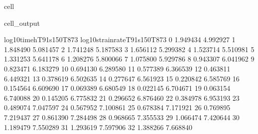 \documentclass[letterpaper,10pt,english]{jupyterBook}
\begin{document}
\begin{sphinxuseclass}{cell}
\begin{sphinxVerbatimOutput}
\begin{sphinxuseclass}{cell_output}
\begin{sphinxVerbatim}[commandchars=\\\{\}]
					log10timeh\PYGZus{}T91s150T873  log10strainrate\PYGZus{}T91s150T873  \PYGZbs{}
					0                \PYGZhy{}1.949434                    \PYGZhy{}4.992927   
					1                \PYGZhy{}1.848490                    \PYGZhy{}5.081457   
					2                \PYGZhy{}1.741248                    \PYGZhy{}5.187583   
					3                \PYGZhy{}1.656112                    \PYGZhy{}5.299382   
					4                \PYGZhy{}1.523714                    \PYGZhy{}5.510981   
					5                \PYGZhy{}1.331253                    \PYGZhy{}5.641178   
					6                \PYGZhy{}1.208276                    \PYGZhy{}5.800066   
					7                \PYGZhy{}1.075800                    \PYGZhy{}5.929786   
					8                \PYGZhy{}0.943307                    \PYGZhy{}6.041962   
					9                \PYGZhy{}0.823471                    \PYGZhy{}6.183279   
					10               \PYGZhy{}0.694130                    \PYGZhy{}6.289580   
					11               \PYGZhy{}0.577389                    \PYGZhy{}6.366539   
					12               \PYGZhy{}0.463811                    \PYGZhy{}6.449321   
					13               \PYGZhy{}0.378619                    \PYGZhy{}6.502635   
					14               \PYGZhy{}0.277647                    \PYGZhy{}6.561923   
					15               \PYGZhy{}0.220842                    \PYGZhy{}6.585769   
					16               \PYGZhy{}0.154564                    \PYGZhy{}6.609690   
					17               \PYGZhy{}0.069389                    \PYGZhy{}6.680549   
					18                0.022145                    \PYGZhy{}6.704671   
					19                0.063154                    \PYGZhy{}6.740088   
					20                0.145205                    \PYGZhy{}6.775832   
					21                0.296652                    \PYGZhy{}6.876460   
					22                0.384978                    \PYGZhy{}6.953193   
					23                0.489074                    \PYGZhy{}7.047597   
					24                0.567952                    \PYGZhy{}7.100861   
					25                0.678384                    \PYGZhy{}7.171921   
					26                0.769895                    \PYGZhy{}7.219437   
					27                0.861390                    \PYGZhy{}7.284498   
					28                0.968665                    \PYGZhy{}7.355533   
					29                1.066474                    \PYGZhy{}7.420644   
					30                1.189479                    \PYGZhy{}7.550289   
					31                1.293619                    \PYGZhy{}7.597906   
					32                1.388266                    \PYGZhy{}7.668840   

\end{sphinxVerbatim}
\end{sphinxuseclass}
\end{sphinxVerbatimOutput}
\end{sphinxuseclass}
\end{document}
